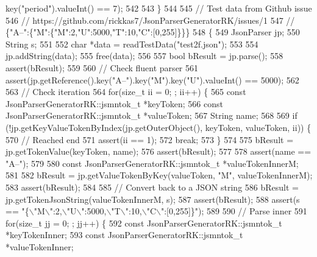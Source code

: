 \begin{DoxyCode}
{{{{{{      key(\textcolor{stringliteral}{"period"}).valueInt() == 7);
542 
543     \}
544 
545     \textcolor{comment}{// Test data from Github issue}
546     \textcolor{comment}{// https://github.com/rickkas7/JsonParserGeneratorRK/issues/1}
547     \textcolor{comment}{// \{"A--":\{"M":\{"M":2,"U":5000,"T":10,"C":[0,255]\}\}\}}
548     \{
549         JsonParser jp;
550         String s;
551 
552         \textcolor{keywordtype}{char} *data = readTestData(\textcolor{stringliteral}{"test2f.json"});
553 
554         jp.addString(data);
555         free(data);
556 
557         \textcolor{keywordtype}{bool} bResult = jp.parse();
558         assert(bResult);
559 
560         \textcolor{comment}{// Check fluent parser}
561         assert(jp.getReference().key(\textcolor{stringliteral}{"A--"}).key(\textcolor{stringliteral}{"M"}).key(\textcolor{stringliteral}{"U"}).valueInt() == 5000);
562 
563         \textcolor{comment}{// Check iteration}
564         \textcolor{keywordflow}{for}(\textcolor{keywordtype}{size\_t} ii = 0; ; ii++) \{
565             \textcolor{keyword}{const} JsonParserGeneratorRK::jsmntok_t *keyToken;
566             \textcolor{keyword}{const} JsonParserGeneratorRK::jsmntok_t *valueToken;
567             String name;
568 
569             \textcolor{keywordflow}{if} (!jp.getKeyValueTokenByIndex(jp.getOuterObject(), keyToken, valueToken, ii)) \{
570                 \textcolor{comment}{// Reached end}
571                 assert(ii == 1);
572                 \textcolor{keywordflow}{break};
573             \}
574 
575             bResult = jp.getTokenValue(keyToken, name);
576             assert(bResult);
577 
578             assert(name == \textcolor{stringliteral}{"A--"});
579 
580             \textcolor{keyword}{const} JsonParserGeneratorRK::jsmntok_t *valueTokenInnerM;
581 
582             bResult = jp.getValueTokenByKey(valueToken, \textcolor{stringliteral}{"M"}, valueTokenInnerM);
583             assert(bResult);
584 
585             \textcolor{comment}{// Convert back to a JSON string}
586             bResult = jp.getTokenJsonString(valueTokenInnerM, s);
587             assert(bResult);
588             assert(s == \textcolor{stringliteral}{"\{\(\backslash\)"M\(\backslash\)":2,\(\backslash\)"U\(\backslash\)":5000,\(\backslash\)"T\(\backslash\)":10,\(\backslash\)"C\(\backslash\)":[0,255]\}"});
589 
590             \textcolor{comment}{// Parse inner}
591             \textcolor{keywordflow}{for}(\textcolor{keywordtype}{size\_t} jj = 0; ; jj++) \{
592                 \textcolor{keyword}{const} JsonParserGeneratorRK::jsmntok_t *keyTokenInner;
593                 \textcolor{keyword}{const} JsonParserGeneratorRK::jsmntok_t *valueTokenInner;
}}}}}}
\end{DoxyCode}
